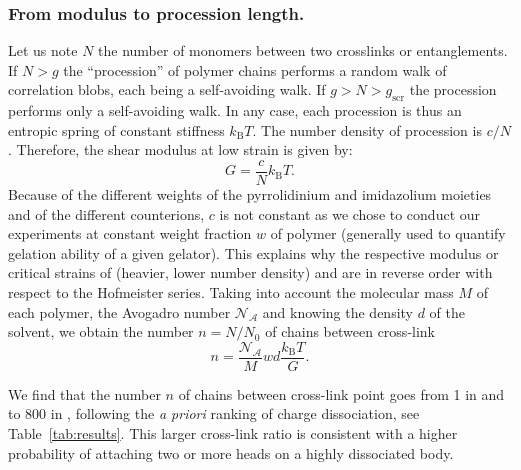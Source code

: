 \documentclass[twoside,twocolumn,9pt]{article}
\begin{document}
\subsubsection{From modulus to procession length.}

Let us note $N$ the number of monomers between two crosslinks or entanglements. If $N>g$ the ``procession'' of polymer chains performs a random walk of correlation blobs, each being a self-avoiding walk. If $g>N>g_\mathrm{scr}$ the procession performs only a self-avoiding walk. In any case, each procession is thus an entropic spring of constant stiffness $k_\mathrm{B}T$. The number density of procession is $c/N$. Therefore, the shear modulus at low strain is given by:
\begin{equation}
G = \frac{c}{N}k_\mathrm{B}T.
\label{eq:G}
\end{equation}
Because of the different weights of the pyrrolidinium and imidazolium moieties and of the different counterions, $c$ is not constant as we chose to conduct our experiments at constant weight fraction $w$ of polymer (generally used to quantify gelation ability of a given gelator). This explains why the respective modulus or critical strains of  (heavier, lower number density) and  are in reverse order with respect to the Hofmeister series. Taking into account the molecular mass $M$ of each polymer, the Avogadro number $\mathcal{N_A}$ and  knowing the density $d$ of the solvent, we obtain the number $n = N/N_0$ of chains between cross-link
\begin{equation}
n = \frac{\mathcal{N_A}}{M} w d \frac{k_\mathrm{B}T}{G}.
\label{eq:n}
\end{equation}

We find that the number $n$ of chains between cross-link point goes from 1 in  and  to 800 in , following the \textit{a priori} ranking of charge dissociation, see Table~\ref{tab:results}. This larger cross-link ratio is consistent with a higher probability of attaching two or more heads on a highly dissociated body.
\end{document}

